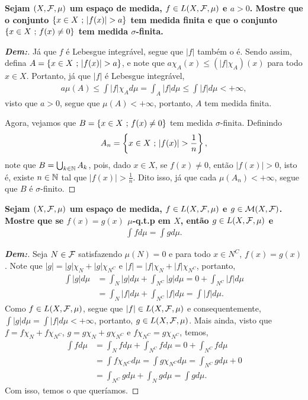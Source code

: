 \textbf{Sejam $(X, \mathcal F, \mu)$ um espaço de medida, $f \in L(X, \mathcal F, \mu)$
e $a > 0$. Mostre que o conjunto $\left\{x \in X \text{ ; } |f(x)| > a\right\}$ tem medida 
finita e que o conjunto $\left\{x \in X \text{ ; } f(x) \neq 0\right\}$ tem medida $\sigma$-finita.}
\begin{proof}[\textbf{Dem:}] Já que $f$ é Lebesgue integrável, segue que 
  $|f|$ também o é. Sendo assim, defina $A = \{x \in X \text{ ; } |f(x)| > a\}$, e 
  note que $a \chi_A(x) \le (|f|\chi_A)(x)$ para todo $x \in X$. Portanto, 
  já que $|f|$ é Lebesgue integrável,
  \begin{align*}
    a\mu(A) \le \int |f|\chi_A d\mu = \int_A |f| d\mu \le \int |f| d\mu < +\infty, 
  \end{align*}
  visto que $a > 0$, segue que $\mu(A) < +\infty$, portanto, $A$ tem medida finita.
  
  Agora, vejamos que $B = \{x \in X \text{ ; } f(x) \neq 0\}$ tem medida $\sigma$-finita.
  Definindo $$A_n = \left\{x \in X \text{ ; } |f(x)| > \frac{1}{n}\right\},$$
  note que $B = \bigcup_{k \in \mathbb N} A_k$, pois, dado $x \in X$, se $f(x) \neq 0$, 
  então $|f(x)| > 0$, isto é, existe $n \in \mathbb N$ tal que $|f(x)|> \frac{1}{n}$.
  Dito isso, já que cada $\mu(A_n) < +\infty$,
  segue que $B$ é $\sigma$-finito.
\end{proof}

\textbf{Sejam $(X, \mathcal F, \mu)$ um espaço de medida, $f \in L(X, \mathcal F, \mu)$
e $g \in \mathcal M (X, \mathcal F)$. Mostre que se $f(x) = g(x)$ $\mu$-q.t.p em 
$X$, então $g \in L(X, \mathcal F, \mu)$ e 
\begin{align*}
  \int f d\mu = \int g d\mu.
\end{align*}}
\begin{proof}[\textbf{Dem:}] Seja $N \in \mathcal F$ satisfazendo $\mu(N) =0$
  e para todo $x \in N^C$, $f(x) = g(x)$. Note que $|g| = |g|\chi_N + |g|\chi_{N^C}$
  e $|f| = |f| \chi_N + |f|\chi_{N^C}$, portanto, 
  \begin{align*}
    \int |g| d\mu &= \int_N |g| d\mu + \int_{N^C} |g| d\mu = 0 + \int_{N^C} |f| d\mu \\
    &=\int_N |f| d\mu + \int_{N^C} |f| d\mu = \int |f| d\mu.
  \end{align*}
  Como $f \in L(X, \mathcal F, \mu)$, segue que $|f| \in L(X, \mathcal F, \mu)$ e consequentemente, 
  $\int |g| d\mu = \int |f| d\mu < +\infty$, portanto, $g \in L(X, \mathcal F, \mu)$. 
  Mais ainda, 
  visto que $f = f\chi_N + f\chi_{N^C}$, 
  $g = g\chi_N + g\chi_{N^C}$ e $f\chi_{N^C} = g\chi_{N^C}$, temos,
  \begin{align*}
    \int f d\mu &= \int_N f d\mu + \int_{N^C} f d\mu = 0 + \int_{N^C} f d\mu\\
    &=\int f \chi_{N^C} d\mu = \int g\chi_{N^C} d\mu = \int_{N^C} g d\mu + 0\\
    &=\int_{N^C} g d\mu + \int_{N} g d\mu = \int g d\mu.
  \end{align*}
  Com isso, temos o que queríamos.
\end{proof}

